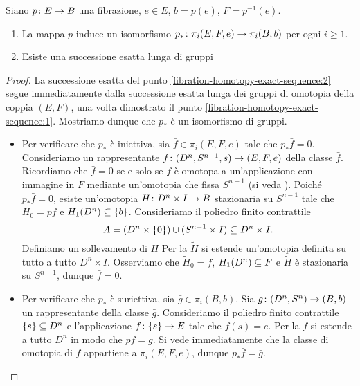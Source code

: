 \begin{proposition}
Siano \(\map{p}{E}{B}\) una fibrazione, \(e\in E\), \(b=p(e)\), \(F=p^{-1}(e)\).
\begin{enumerate}
\item\label{fibration-homotopy-exact-sequence:1} La mappa \(p\) induce un isomorfismo \(\map{p_*}{\pi_i(E,F,e)}{\pi_i(B,b)}\) per ogni \(i\ge 1\).
\item\label{fibration-homotopy-exact-sequence:2} Esiste una successione esatta lunga di gruppi
\end{enumerate}
\end{proposition}
\begin{proof}
La successione esatta del punto \ref{fibration-homotopy-exact-sequence:2} segue immediatamente dalla successione esatta lunga dei gruppi di omotopia della coppia \((E,F)\), una volta dimostrato il punto \ref{fibration-homotopy-exact-sequence:1}. Mostriamo dunque che \(p_*\) è un isomorfismo di gruppi.
\begin{itemize}
\item Per verificare che \(p_*\) è iniettiva, sia \(\bar{f}\in\pi_i(E,F,e)\) tale che \(p_*\bar{f}=0\). Consideriamo un rappresentante \(\map{f}{(D^n,S^{n-1},s)}{(E,F,e)}\) della classe \(\bar{f}\). Ricordiamo che \(\bar{f}=0\) se e solo se \(f\) è omotopa a un'applicazione con immagine in \(F\) mediante un'omotopia che fissa \(S^{n-1}\) (si veda ). Poiché \(p_*\bar{f}=0\), esiste un'omotopia \(\map{H}{D^n\times I}{B}\) stazionaria su \(S^{n-1}\) tale che \(H_0=pf\) e \(H_1(D^n)\subseteq\{b\}\). Consideriamo il poliedro finito contrattile 
\[
A=(D^n\times\{0\})\cup(S^{n-1}\times I)\subseteq D^n\times I.
\]
Definiamo un sollevamento di \(H\)
Per la  \(\tilde{H}\) si estende un'omotopia definita su tutto a tutto \(D^n\times I\). Osserviamo che \(\tilde{H}_0=f\), \(\tilde{H}_1(D^n)\subseteq F\) e \(\tilde{H}\) è stazionaria su \(S^{n-1}\), dunque \(\bar{f}=0\).
\item Per verificare che \(p_*\) è suriettiva, sia \(\bar{g}\in\pi_i(B,b)\). Sia \(\map{g}{(D^n,S^n)}{(B,b)}\) un rappresentante della classe \(\bar{g}\). Consideriamo il poliedro finito contrattile \(\{s\}\subseteq D^n\) e l'applicazione \(\map{f}{\{s\}}{E}\) tale che \(f(s)=e\). Per la  \(f\) si estende a tutto \(D^n\) in modo che \(pf=g\). Si vede immediatamente che la classe di omotopia di \(f\) appartiene a \(\pi_i(E,F,e)\), dunque \(p_*\bar{f}=\bar{g}\).\qedhere
\end{itemize}
\end{proof}

